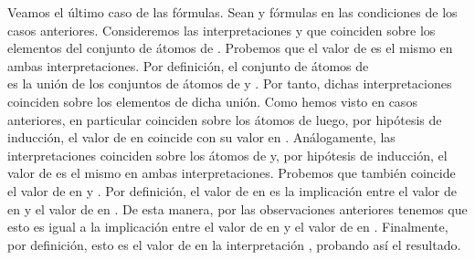 \begin{isabellebody}
\begin{isamarkuptext}
\begin{demostracion}
    Veamos el último caso de las fórmulas. Sean  y  fórmulas en 
    las condiciones de los casos anteriores. Consideremos las
    interpretaciones  y  que coinciden sobre los elementos
    del conjunto de átomos de . Probemos que el valor de 
     es el mismo en ambas interpretaciones. Por definición, 
    el conjunto de átomos de\\  es la unión de los
    conjuntos de átomos de  y . Por tanto, dichas
    interpretaciones coinciden sobre los elementos de dicha unión. 
    Como hemos visto en casos anteriores, en particular coinciden sobre
    los átomos de  luego, por hipótesis de inducción, el valor de 
     en  coincide con su valor en . Análogamente, las
    interpretaciones coinciden sobre los átomos de  y, por hipótesis
    de inducción, el valor de  es el mismo en ambas
    interpretaciones. Probemos que también coincide el valor de 
    en  y .
    Por definición, el valor de  en  es la implicación
    entre el valor de  en  y el valor de  en . De
    esta manera, por las observaciones anteriores tenemos que esto es
    igual a la implicación entre el valor de  en  y el valor
    de  en . Finalmente, por definición, esto es el valor de
     en la interpretación , probando así el resultado.    
  \end{demostracion}


\end{isamarkuptext}
\end{isabellebody}
